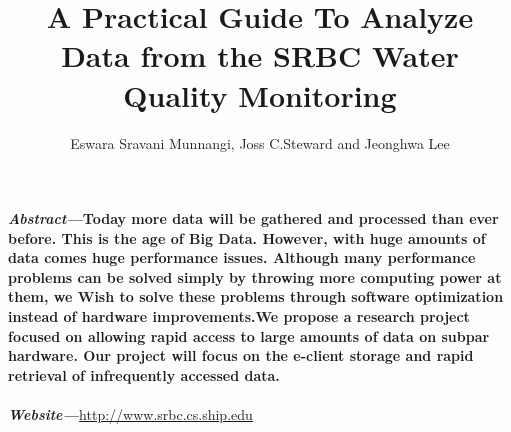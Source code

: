 \documentclass[a4paper]{article}
\begin{document}
\title{A Practical Guide To Analyze Data from the SRBC Water Quality Monitoring}
\author{Eswara Sravani Munnangi, Joss C.Steward and Jeonghwa Lee}
\date{\vspace{-2ex}}
\maketitle
\begin{minipage}[t]{0.45\textwidth}
{\normalsize  \textit{\textbf{ Abstract---}}}{\normalsize \textbf{Today more data will be gathered and processed than ever before. This is the age of Big Data. However, with huge amounts of data comes huge performance issues. Although many performance problems can be solved simply by throwing more computing power at them, we Wish to solve these problems through software optimization instead of hardware improvements.We propose a research project focused on allowing rapid access to large amounts of data on subpar hardware. Our project will focus on the e-client storage and rapid retrieval of infrequently accessed data.\\}}
{\normalsize \textit{\textbf{\\Website---}}}\url{http://www.srbc.cs.ship.edu}

\end{minipage}
\end{document}

